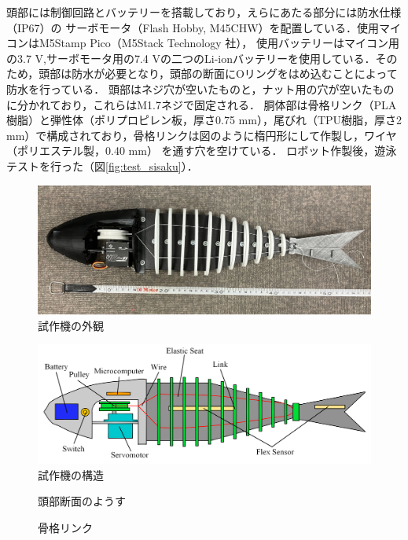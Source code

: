 頭部には制御回路とバッテリーを搭載しており，えらにあたる部分には防水仕様（IP67）の サーボモータ（Flash Hobby, M45CHW）を配置している．使用マイコンはM5Stamp Pico（M5Stack Technology 社），
使用バッテリーはマイコン用の3.7 V,サーボモータ用の7.4 Vの二つのLi-ionバッテリーを使用している．そのため，頭部は防水が必要となり，頭部の断面にOリングをはめ込むことによって防水を行っている．
頭部はネジ穴が空いたものと，ナット用の穴が空いたものに分かれており，これらはM1.7ネジで固定される．
胴体部は骨格リンク（PLA樹脂）と弾性体（ポリプロピレン板，厚さ0.75 mm），尾びれ（TPU樹脂，厚さ2 mm）で構成されており，骨格リンクは図のように楕円形にして作製し，ワイヤ（ポリエステル製，0.40 mm）
を通す穴を空けている．
ロボット作製後，遊泳テストを行った（図\ref{fig:test_sisaku}）．

\begin{figure}[t]
    \centering
    \includegraphics[width=0.80\linewidth]{chapters/picture/sisaku.jpg}
    \caption{試作機の外観}
    \label{fig:sisaku}
\end{figure}
\begin{figure}[t]
    \centering
    \includegraphics[width=0.80\linewidth]{chapters/picture/tentativeschematic.png}
    \caption{試作機の構造}
    \label{fig:kouzou_sisaku}
\end{figure}
\begin{figure}[t]
    \centering
     \begin{minipage}[b]{0.50\linewidth}
        \centering
        \caption{頭部断面のようす}
        \label{fig:danmen}
     \end{minipage}
     \hspace{0.05\linewidth}
     \begin{minipage}[b]{0.25\linewidth}
        \centering
        \caption{骨格リンク}
        \label{fig:link_sen}
     \end{minipage}
\end{figure}

